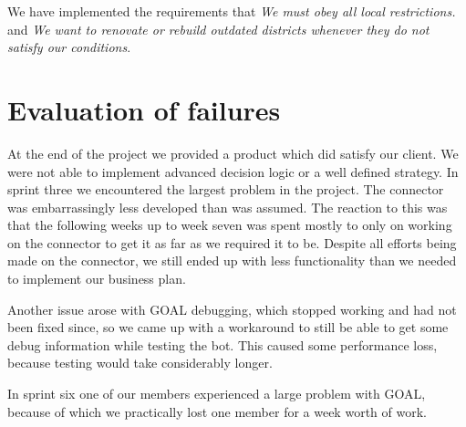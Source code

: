 We have implemented the requirements that \emph{We must obey all local restrictions.} and \emph{We want to renovate or rebuild outdated districts whenever they do not satisfy our conditions}.

\section{Evaluation of failures} At the end of the project we provided a product which did satisfy our client. We were not able to implement advanced decision logic or a well defined strategy. 
In sprint three we encountered the largest problem in the project. The connector was embarrassingly less developed than was assumed. The reaction to this was that the following weeks up to week seven was spent mostly to only on working on the connector to get it as far as we required it to be. Despite all efforts being made on the connector, we still ended up with less functionality than we needed to implement our business plan. 

Another issue arose with GOAL debugging, which stopped working and had not been fixed since, so we came up with a workaround to still be able to get some debug information while testing the bot. This caused some performance loss, because testing would take considerably longer.

In sprint six one of our members experienced a large problem with GOAL, because of which we practically lost one member for a week worth of work.